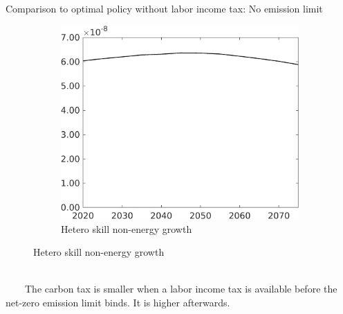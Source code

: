 \documentclass[11pt,aspectratio=169]{beamer}
\begin{document}
\begin{frame}{Comparison to optimal policy without labor income tax: No emission limit}
\begin{figure}[h!!]
\begin{subfigure}{0.32\textwidth}
\end{subfigure}	
\begin{subfigure}{0.32\textwidth}		
\caption{Hetero skill non-energy growth}
\includegraphics[width=1\textwidth]{../codding_model/own_basedOnFried/optimalPol_010922_revision/figures/all_13Sept22_Tplus30/gAn_OPT_NOT_NoTaus_COMPtaulPer_regime4_spillover0_knspil0_noskill0_sep0_xgrowth0_PV1_etaa0.79.png}
\end{subfigure}
	\end{figure}
	\vspace{5mm}
	\begin{block}{}
		\ \\
		\ \ \ \ The carbon tax is smaller when a labor income tax is available before the net-zero emission limit binds. It is higher afterwards.\  \ \\ \ 
	\end{block}	
\end{frame}
\end{document}
